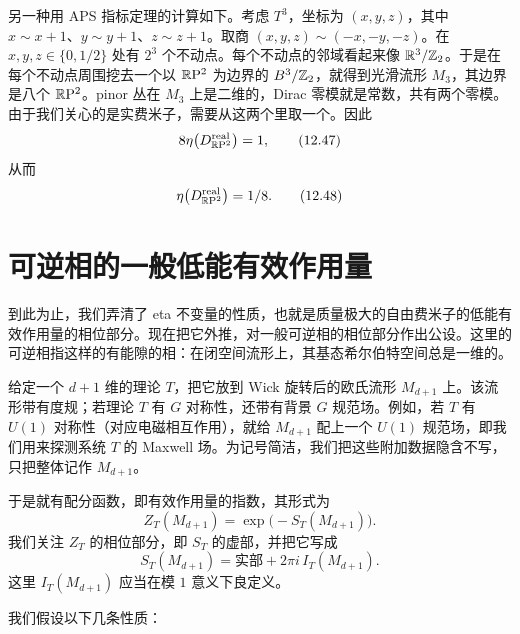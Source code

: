 另一种用 APS 指标定理的计算如下。考虑 $T^3$，坐标为 $(x,y,z)$，其中 $x\sim x+1$、$y\sim y+1$、$z\sim z+1$。取商 $(x,y,z)\sim(-x,-y,-z)$。在 $x,y,z\in\{0,1/2\}$ 处有 $2^3$ 个不动点。每个不动点的邻域看起来像 $\mathbb{R}^3/\mathbb{Z}_2$。于是在每个不动点周围挖去一个以 $\mathbb{R}\mathrm{P}^2$ 为边界的 $B^3/\mathbb{Z}_2$，就得到光滑流形 $M_3$，其边界是八个 $\mathbb{R}\mathrm{P}^2$。pinor 丛在 $M_3$ 上是二维的，Dirac 零模就是常数，共有两个零模。由于我们关心的是实费米子，需要从这两个里取一个。因此
\begin{equation}
  8\eta\bigl(D^{\text{real}}_{\mathbb{R}\mathrm{P}^2}\bigr)=1,
  \tag{12.47}
\end{equation}
从而
\begin{equation}
  \eta\bigl(D^{\text{real}}_{\mathbb{R}\mathrm{P}^2}\bigr)=1/8 .
  \tag{12.48}
\end{equation}



\section{可逆相的一般低能有效作用量}

到此为止，我们弄清了 eta 不变量的性质，也就是质量极大的自由费米子的低能有效作用量的相位部分。现在把它外推，对一般可逆相的相位部分作出公设。这里的可逆相指这样的有能隙的相：在闭空间流形上，其基态希尔伯特空间总是一维的。

给定一个 $d+1$ 维的理论 $T$，把它放到 Wick 旋转后的欧氏流形 $M_{d+1}$ 上。该流形带有度规；若理论 $T$ 有 $G$ 对称性，还带有背景 $G$ 规范场。例如，若 $T$ 有 $U(1)$ 对称性（对应电磁相互作用），就给 $M_{d+1}$ 配上一个 $U(1)$ 规范场，即我们用来探测系统 $T$ 的 Maxwell 场。为记号简洁，我们把这些附加数据隐含不写，只把整体记作 $M_{d+1}$。

于是就有配分函数，即有效作用量的指数，其形式为
\begin{equation}
  Z_T(M_{d+1})=\exp\bigl(-S_T(M_{d+1})\bigr).
  \tag{12.49}
\end{equation}
我们关注 $Z_T$ 的相位部分，即 $S_T$ 的虚部，并把它写成
\begin{equation}
  S_T(M_{d+1})=\text{实部}+2\pi i\,I_T(M_{d+1}).
  \tag{12.50}
\end{equation}
这里 $I_T(M_{d+1})$ 应当在模 $1$ 意义下良定义。

我们假设以下几条性质：

